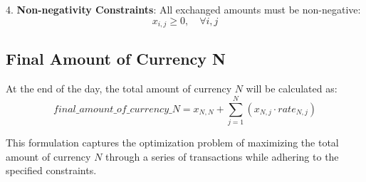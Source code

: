 \documentclass{article}
\begin{document}
4. \textbf{Non-negativity Constraints}:
   All exchanged amounts must be non-negative:
   \[
   x_{i,j} \geq 0, \quad \forall i, j
   \]

\subsection*{Final Amount of Currency N}

At the end of the day, the total amount of currency \(N\) will be calculated as:
\[
final\_amount\_of\_currency\_N = x_{N,N} + \sum_{j=1}^{N} (x_{N,j} \cdot rate_{N,j})
\]

This formulation captures the optimization problem of maximizing the total amount of currency \(N\) through a series of transactions while adhering to the specified constraints.
\end{document}
